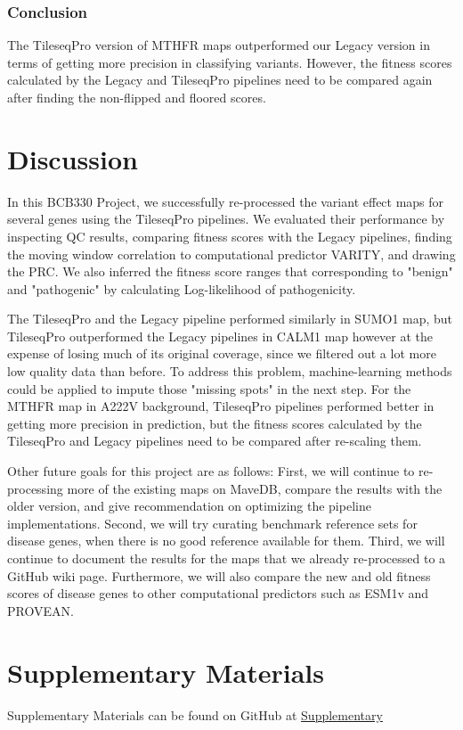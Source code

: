 \documentclass{article}
\begin{document}
\subsubsection{Conclusion}
The TileseqPro version of MTHFR maps outperformed our Legacy version in terms of getting more precision in classifying variants. However, the fitness scores calculated by the Legacy and TileseqPro pipelines need to be compared again after finding the non-flipped and floored scores. 




\newpage
\section{Discussion}
In this BCB330 Project, we successfully re-processed the variant effect maps for several genes using the TileseqPro pipelines. We evaluated their performance by inspecting QC results, comparing fitness scores with the Legacy pipelines, finding the moving window correlation to computational predictor VARITY, and drawing the PRC. We also inferred the fitness score ranges that corresponding to "benign" and "pathogenic" by calculating Log-likelihood of pathogenicity. 

The TileseqPro and the Legacy pipeline performed similarly in SUMO1 map, but TileseqPro outperformed the Legacy pipelines in CALM1 map however at the expense of losing much of its original coverage, since we filtered out a lot more low quality data than before. To address this problem, machine-learning methods could be applied to impute those "missing spots" in the next step. For the MTHFR map in A222V background, TileseqPro pipelines performed better in getting more precision in prediction, but the fitness scores calculated by the TileseqPro and Legacy pipelines need to be compared after re-scaling them. 

Other future goals for this project are as follows: First, we will continue to re-processing more of the existing maps on MaveDB, compare the results with the older version, and give recommendation on optimizing the pipeline implementations. Second, we will try curating benchmark reference sets for disease genes, when there is no good reference available for them. Third, we will continue to document the results for the maps that we already re-processed
to a GitHub wiki page. Furthermore, we will also compare the new and old fitness scores of disease genes to other computational predictors such as ESM1v\cite{lin2023evolutionary} and PROVEAN\cite{sandell_fitness_2022}.


\section{Supplementary Materials}
Supplementary Materials can be found on GitHub at \href{https://github.com/Bilin22/BCB330-Final-Report/blob/main/main/Supplementary.pdf}{Supplementary}




\end{document}
